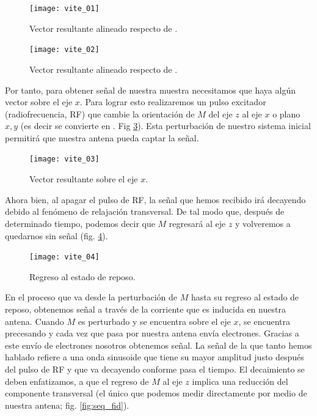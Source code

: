 \begin{figure}[htb]
\begin{figg}
   \texttt{[image: vite\_01]}
   \caption{Vector resultante alineado respecto de \Bzero.}
 \label{fig:seq_vectorResultante}
 \end{figg}
\end{figure}

\begin{figure}[htb]
\begin{figg}
   \texttt{[image: vite\_02]}
   \caption{Vector resultante alineado respecto de \Bzero.}
 \label{fig:seq_antena}
 \end{figg}
\end{figure}



Por tanto, para obtener señal de nuestra muestra necesitamos que haya algún vector sobre el eje $x$. Para lograr esto realizaremos un pulso excitador (radiofrecuencia, RF) que cambie la orientación de $M$ del eje $z$ al eje $x$ o plano $x,y$ (es decir \Mz se convierte en \Mxy. Fig \ref{fig:seq_Mx}). Esta perturbación de nuestro sistema inicial permitirá que nuestra antena pueda captar la señal.



\begin{figure}[htb]
\begin{figg}
   \texttt{[image: vite\_03]}
   \caption{Vector resultante sobre el eje $x$.}
 \label{fig:seq_Mx}
 \end{figg}
\end{figure}


Ahora bien, al apagar el pulso de RF, la señal que hemos recibido irá decayendo debido al fenómeno de relajación transversal. De tal modo que, después de determinado tiempo, podemos decir que $M$ regresará al eje $z$ y volveremos a quedarnos sin señal (fig. \ref{fig:seq_relax}). 

\begin{figure}[htb]
\begin{figg}
   \texttt{[image: vite\_04]}
   \caption{Regreso al estado de reposo.}
 \label{fig:seq_relax}
 \end{figg}
\end{figure}
 


En el proceso que va desde la perturbación de $M$ hasta su regreso al estado de reposo, obtenemos señal a través de la corriente que es inducida en nuestra antena. Cuando $M$ es perturbado y se encuentra sobre el eje $x$, se encuentra precesando y cada vez que pasa por nuestra antena envía electrones. Gracias a este envío de electrones nosotros obtenemos señal. La señal de la que tanto hemos hablado refiere a una onda sinusoide que tiene su mayor amplitud justo después del pulso de RF y que va decayendo conforme pasa el tiempo. El decaimiento se deben enfatizamos, a que el regreso de $M$ al eje $z$ implica una reducción del componente transversal (el único que podemos medir directamente por medio de nuestra antena; fig. \ref{fig:seq_fid}). 

